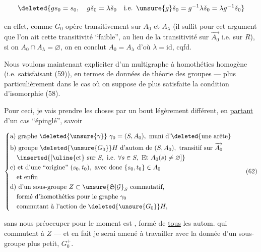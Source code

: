 \[
\deleted{gs_0=s_0,\quad g\check s_0=\lambda\check s_0\quad\text{i.e. }\unsure{g}\check s_{0}=g^{-1}\lambda\check s_0=\lambda g^{-1}\check s_0}
\]

en effet, comme $G_0$ opère transitivement sur $A_0$ et $A_\lambda$ (il suffit  pour cet argument que l'on ait cette transitivité \textquotedblleft{}faible\textquotedblright, au lieu de la transitivité sur $\overrightarrow{A_0}$  i.e. sur $R$), si on  $A_0\cap A_\lambda=\varnothing$, on en conclut $A_0=A_\lambda$ d'où $\lambda=\mathrm{id}$, cqfd.

Nous voulons maintenant expliciter     d'un  multigraphe à homothéties homogène (i.e. satisfaisant (59)), en termes de données de théorie des groupes --- plus particulièrement dans le cas où on suppose de plus satisfaite la condition d'isomorphie (58).

Pour ceci,  je vais prendre les choses par un bout légèrement différent, en  \uline{partant} d'un cas \textquotedblleft{}épinglé\textquotedblright,  savoir

\[
\left\{\begin{aligned}
&\text{a) graphe }\deleted{\unsure{\gamma}}\ \gamma_0=(S,A_0),\text{ muni d'\deleted{une arête}}\\
&\text{b) groupe }\deleted{\unsure{G_0}}H\text{ d'autom de }(S,A_0),\text{ transitif sur }\overrightarrow{A_0}\\
&\quad\inserted{[\text{\uline{et} sur }S,\ \text{i.e. }\forall s\in S,\ \mathrm{Et}\ A_0(s)\ne\varnothing]}\\
&\text{c) et d'une \textquotedblleft{}origine\textquotedblright{} }(s_0,t_0),\text{ avec donc }\{s_0,t_0\}\in A_0\\
&\quad\text{et enfin}\\
&\text{d) d'un sous-groupe } Z\subset\unsure{\mathfrak S|\mathcal G}_S\text{ commutatif,}\\
&\quad\text{formé d'homothéties pour le graphe }\gamma_0\\
&\quad\text{commutant à l'action de }\deleted{\unsure{G_0}}H,
\end{aligned}\right.
\tag*{(62)}
\]

sans nous préoccuper pour le moment   est , formé de \uline{tous} les autom.   qui commutent à $Z$ --- et en fait je serai amené à travailler avec la donnée d'un sous-groupe  plus petit, $G_0^{+}$. 

